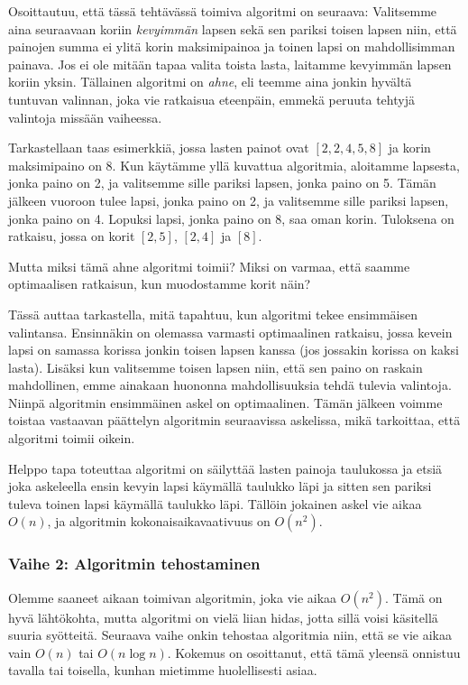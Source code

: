 Osoittautuu, että tässä tehtävässä toimiva algoritmi
on seuraava:
Valitsemme aina seuraavaan koriin
\emph{kevyimmän} lapsen sekä sen pariksi
toisen lapsen niin, että painojen summa ei ylitä
korin maksimipainoa ja toinen lapsi on
mahdollisimman painava.
Jos ei ole mitään tapaa valita toista lasta,
laitamme kevyimmän lapsen koriin yksin.
Tällainen algoritmi on \emph{ahne}, eli teemme aina jonkin hyvältä
tuntuvan valinnan, joka vie ratkaisua eteenpäin,
emmekä peruuta tehtyjä valintoja missään vaiheessa.

Tarkastellaan taas esimerkkiä,
jossa lasten painot ovat $[2,2,4,5,8]$
ja korin maksimipaino on 8.
Kun käytämme yllä kuvattua algoritmia,
aloitamme lapsesta, jonka paino on 2,
ja valitsemme sille pariksi lapsen, jonka paino on 5.
Tämän jälkeen vuoroon tulee lapsi, jonka paino on 2,
ja valitsemme sille pariksi lapsen, jonka paino on 4.
Lopuksi lapsi, jonka paino on 8, saa oman korin.
Tuloksena on ratkaisu,
jossa on korit $[2,5]$, $[2,4]$ ja $[8]$.

Mutta miksi tämä ahne algoritmi toimii?
Miksi on varmaa, että saamme optimaalisen ratkaisun,
kun muodostamme korit näin?

Tässä auttaa tarkastella, mitä tapahtuu,
kun algoritmi tekee ensimmäisen valintansa.
Ensinnäkin on olemassa varmasti optimaalinen ratkaisu,
jossa kevein lapsi on samassa korissa jonkin toisen lapsen kanssa
(jos jossakin korissa on kaksi lasta).
Lisäksi kun valitsemme toisen lapsen niin,
että sen paino on raskain mahdollinen,
emme ainakaan huononna mahdollisuuksia tehdä tulevia valintoja.
Niinpä algoritmin ensimmäinen askel on optimaalinen.
Tämän jälkeen voimme toistaa vastaavan päättelyn
algoritmin seuraavissa askelissa, mikä tarkoittaa,
että algoritmi toimii oikein.

Helppo tapa toteuttaa algoritmi on säilyttää lasten
painoja taulukossa ja etsiä joka askeleella ensin
kevyin lapsi käymällä taulukko läpi ja sitten sen 
pariksi tuleva toinen lapsi käymällä taulukko läpi.
Tällöin jokainen askel vie aikaa $O(n)$,
ja algoritmin kokonaisaikavaativuus on $O(n^2)$.

\subsubsection{Vaihe 2: Algoritmin tehostaminen}

Olemme saaneet aikaan toimivan algoritmin, joka vie aikaa $O(n^2)$.
Tämä on hyvä lähtökohta, mutta algoritmi on vielä liian hidas,
jotta sillä voisi käsitellä suuria syötteitä.
Seuraava vaihe onkin tehostaa algoritmia niin,
että se vie aikaa vain $O(n)$ tai $O(n \log n)$.
Kokemus on osoittanut, että tämä yleensä onnistuu tavalla
tai toisella, kunhan mietimme huolellisesti asiaa.

